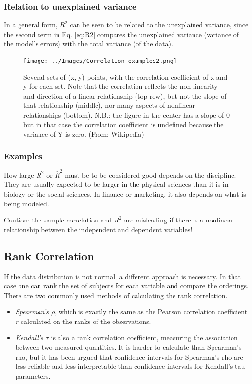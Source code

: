 \subsubsection{Relation to unexplained variance}

In a general form, $R^2$ can be seen to be related to the unexplained variance, since the second term in Eq. \ref{eq:R2} compares the unexplained variance (variance of the model's errors) with the total variance (of the data).

\begin{figure}
  \centering
  \texttt{[image: ../Images/Correlation\_examples2.png]}\\
  \caption{Several sets of (x, y) points, with the correlation coefficient of x and y for each set. Note that the correlation reflects the non-linearity and direction of a linear relationship (top row), but not the slope of that relationship (middle), nor many aspects of nonlinear relationships (bottom). N.B.: the figure in the center has a slope of 0 but in that case the correlation coefficient is undefined because the variance of Y is zero. (From: Wikipedia)}\label{fig:correlation}
\end{figure}

\subsubsection{Examples}

How large $R^2$ or $\bar{R}^2$ must be to be considered good depends on the discipline. They are usually expected to be larger in the physical sciences than it is in biology or the social sciences. In finance or marketing, it also depends on what is being modeled.

Caution: the sample correlation and $R^2$ are misleading if there is a nonlinear relationship between the independent and dependent variables!

\subsection{Rank Correlation}

If the data distribution is not normal, a different approach is necessary. In that case one can rank the set of subjects for each variable and compare the orderings. There are two commonly used methods of calculating the rank correlation. 

\begin{itemize}
  \item   \emph{Spearman's $\rho$}, which is exactly the same as the Pearson correlation coefficient $r$ calculated on the ranks of the observations.
  \item   \emph{Kendall's $\tau$} is also a rank correlation coefficient, measuring the association between two measured quantities. It is harder to calculate than Spearman's rho, but it has been argued that confidence intervals for Spearman’s rho are less reliable and less interpretable than confidence intervals for Kendall’s tau-parameters.
\end{itemize}

